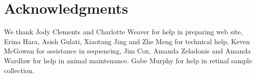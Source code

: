 \section{Acknowledgments}
We thank Jody Clements and Charlotte Weaver for help in preparing web site, Erina Hara, Asish Gulati, Xiaotang Jing and Zhe Meng for technical help, Keven McGowan for assistance in sequencing, Jim Cox, Amanda Zeladonis and Amanda Wardlaw for help in animal maintenance. Gabe Murphy for help in retinal sample collection.